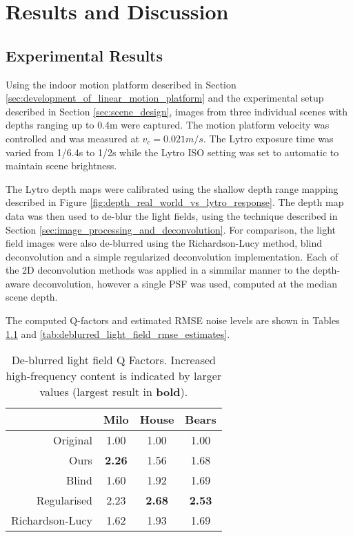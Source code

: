 
\chapter{Results and Discussion}
\label{chap:results_and_discussion}

\section{Experimental Results}
\label{sec:experimental_results}

Using the indoor motion platform described in Section \ref{sec:development_of_linear_motion_platform} and the experimental setup described in Section \ref{sec:scene_design}, images from three individual scenes with depths ranging up to \nicetilde0.4m were captured.
The motion platform velocity was controlled and was measured at $v_c = 0.021m/s$.
The Lytro exposure time was varied from 1/6.4s to 1/2s while the Lytro ISO setting was set to automatic to maintain scene brightness.

The Lytro depth maps were calibrated using the shallow depth range mapping described in Figure \ref{fig:depth_real_world_vs_lytro_response}.
The depth map data was then used to de-blur the light fields, using the technique described in Section \ref{sec:image_processing_and_deconvolution}.
For comparison, the light field images were also de-blurred using the Richardson-Lucy method, blind deconvolution and a simple regularized deconvolution implementation.
Each of the 2D deconvolution methods was applied in a simmilar manner to the depth-aware deconvolution, however a single PSF was used, computed at the median scene depth.

The computed Q-factors and estimated RMSE noise levels are shown in Tables \ref{tab:deblurred_light_field_q_factors} and \ref{tab:deblurred_light_field_rmse_estimates}.


\begin{table}[h]
\centering
\caption[De-blurred light field Q Factors]{
De-blurred light field Q Factors.
Increased high-frequency content is indicated by larger values (largest result in \textbf{bold}).
}
\label{tab:deblurred_light_field_q_factors}
\begin{tabular}[h]{r | c c c}
                & Milo          & House          & Bears         \\
\hline
Original        & 1.00          & 1.00           & 1.00          \\
Ours            & \textbf{2.26} & 1.56           & 1.68          \\
Blind           & 1.60          & 1.92           & 1.69          \\
Regularised     & 2.23          & \textbf{2.68}  & \textbf{2.53} \\
Richardson-Lucy & 1.62          & 1.93           & 1.69          \\
\end{tabular}
\end{table}


